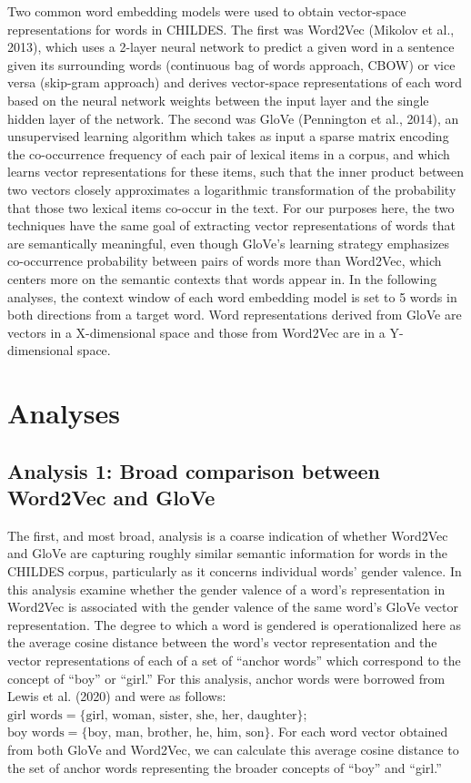 \documentclass[10pt, letterpaper]{article}
\begin{document}
Two common word embedding models were used to obtain vector-space
representations for words in CHILDES. The first was Word2Vec (Mikolov et
al., 2013), which uses a 2-layer neural network to predict a given word
in a sentence given its surrounding words (continuous bag of words
approach, CBOW) or vice versa (skip-gram approach) and derives
vector-space representations of each word based on the neural network
weights between the input layer and the single hidden layer of the
network. The second was GloVe (Pennington et al., 2014), an unsupervised
learning algorithm which takes as input a sparse matrix encoding the
co-occurrence frequency of each pair of lexical items in a corpus, and
which learns vector representations for these items, such that the inner
product between two vectors closely approximates a logarithmic
transformation of the probability that those two lexical items co-occur
in the text. For our purposes here, the two techniques have the same
goal of extracting vector representations of words that are semantically
meaningful, even though GloVe's learning strategy emphasizes
co-occurrence probability between pairs of words more than Word2Vec,
which centers more on the semantic contexts that words appear in. In the
following analyses, the context window of each word embedding model is
set to 5 words in both directions from a target word. Word
representations derived from GloVe are vectors in a X-dimensional space
and those from Word2Vec are in a Y-dimensional space.

\hypertarget{analyses}{%
\section{Analyses}\label{analyses}}

\hypertarget{analysis-1-broad-comparison-between-word2vec-and-glove}{%
\subsection{Analysis 1: Broad comparison between Word2Vec and
GloVe}\label{analysis-1-broad-comparison-between-word2vec-and-glove}}

The first, and most broad, analysis is a coarse indication of whether
Word2Vec and GloVe are capturing roughly similar semantic information
for words in the CHILDES corpus, particularly as it concerns individual
words' gender valence. In this analysis examine whether the gender
valence of a word's representation in Word2Vec is associated with the
gender valence of the same word's GloVe vector representation. The
degree to which a word is gendered is operationalized here as the
average cosine distance between the word's vector representation and the
vector representations of each of a set of ``anchor words'' which
correspond to the concept of ``boy'' or ``girl.'' For this analysis,
anchor words were borrowed from Lewis et al. (2020) and were as follows:
\(\text{girl words} = \{{\text{girl, woman, sister, she, her, daughter}}\}\);
\(\text{boy words} = \{{\text{boy, man, brother, he, him, son}}\}\). For
each word vector obtained from both GloVe and Word2Vec, we can calculate
this average cosine distance to the set of anchor words representing the
broader concepts of ``boy'' and ``girl.''
\end{document}
